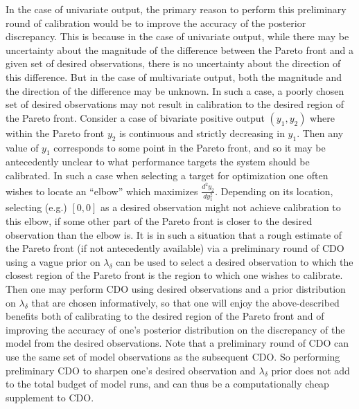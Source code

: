 \documentclass{article}
\begin{document}
In the case of univariate output, the primary reason to perform this preliminary round of calibration would be to improve the accuracy of the posterior discrepancy. 
%
This is because in the case of univariate output, while there may be uncertainty about the magnitude of the difference between the Pareto front and a given set of desired observations, there is no uncertainty about the direction of this difference.
%
But in the case of multivariate output, both the magnitude and the direction of the difference may be unknown.
%
In such a case, a poorly chosen set of desired observations may not result in calibration to the desired region of the Pareto front.
%
Consider a case of bivariate positive output $(y_1,y_2)$ where within the Pareto front $y_2$ is continuous and strictly decreasing in $y_1$. 
%
Then any value of $y_1$ corresponds to some point in the Pareto front, and so it may be antecedently unclear to what performance targets the system should be calibrated.
%
In such a case when selecting a target for optimization one often wishes to locate an ``elbow'' which maximizes $\frac{d^2 y_2}{dy_1^2}$.
%
Depending on its location, selecting (e.g.) $[0,0]$ as a desired observation might not achieve calibration to this elbow, if some other part of the Pareto front is closer to the desired observation than the elbow is.
%
It is in such a situation that a rough estimate of the Pareto front (if not antecedently available) via a preliminary round of CDO using a vague prior on $\lambda_\delta$ can be used to select a desired observation to which the closest region of the Pareto front is the region to which one wishes to calibrate.
%
Then one may perform CDO using desired observations and a prior distribution on $\lambda_\delta$ that are chosen informatively, so that one will enjoy the above-described benefits both of calibrating to the desired region of the Pareto front and of improving the accuracy of one's posterior distribution on the discrepancy of the model from the desired observations.
%
Note that a preliminary round of CDO can use the same set of model observations as the subsequent CDO.
%
So performing preliminary CDO to sharpen one's desired observation and $\lambda_\delta$ prior does not add to the total budget of model runs, and can thus be a computationally cheap supplement to CDO.
\end{document}
